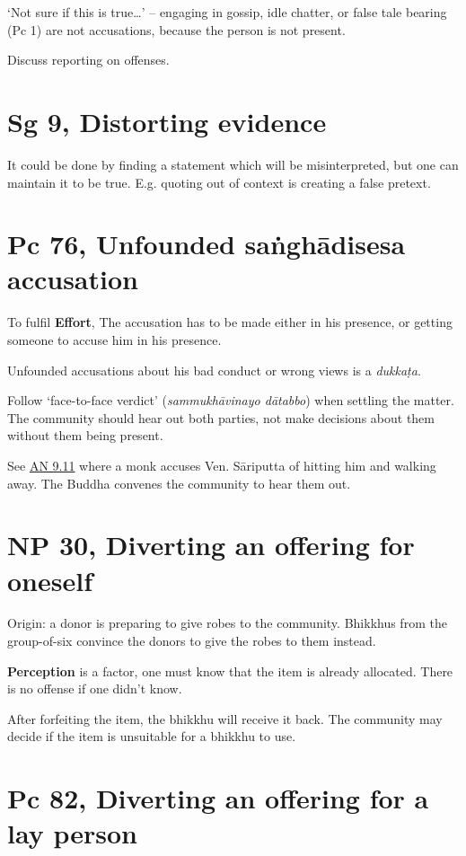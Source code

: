 `Not sure if this is true\ldots{}' -- engaging in gossip, idle chatter,
or false tale bearing (Pc 1) are not accusations, because the person is
not present.

Discuss reporting on offenses.

\section{Sg 9, Distorting evidence}

It could be done by finding a statement which will be misinterpreted,
but one can maintain it to be true. E.g. quoting out of context is
creating a false pretext.

\section{Pc 76, Unfounded saṅghādisesa accusation}

To fulfil \textbf{Effort}, The accusation has to be made either in his
presence, or getting someone to accuse him in his presence.

Unfounded accusations about his bad conduct or wrong views is a
\emph{dukkaṭa}.

Follow `face-to-face verdict' (\emph{sammukhāvinayo dātabbo}) when
settling the matter. The community should hear out both parties, not
make decisions about them without them being present.

See \href{https://suttacentral.net/an9.11/en/sujato}{AN 9.11} where a
monk accuses Ven. Sāriputta of hitting him and walking away. The Buddha
convenes the community to hear them out.

\section{NP 30, Diverting an offering for oneself}

Origin: a donor is preparing to give robes to the community. Bhikkhus
from the group-of-six convince the donors to give the robes to them
instead.

\textbf{Perception} is a factor, one must know that the item is already
allocated. There is no offense if one didn't know.

After forfeiting the item, the bhikkhu will receive it back. The
community may decide if the item is unsuitable for a bhikkhu to use.

\section{Pc 82, Diverting an offering for a lay person}

